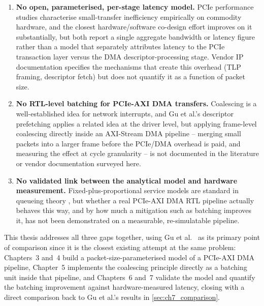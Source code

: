 \begin{enumerate}
\item \textbf{No open, parameterised, per-stage latency model.} PCIe performance studies \cite{neugebauer2018pcie} characterise small-transfer inefficiency empirically on commodity hardware, and the closest hardware/software co-design effort \cite{gu2025cooptimization} improves on it substantially, but both report a single aggregate bandwidth or latency figure rather than a model that separately attributes latency to the PCIe transaction layer versus the DMA descriptor-processing stage. Vendor IP documentation \cite{xilinx2021axidma, xilinx2021pcieintblock} specifies the mechanisms that create this overhead (TLP framing, descriptor fetch) but does not quantify it as a function of packet size.
\item \textbf{No RTL-level batching for PCIe-AXI DMA transfers.} Coalescing is a well-established idea for network interrupts, and Gu et al.'s descriptor prefetching \cite{gu2025cooptimization} applies a related idea at the driver level, but applying frame-level coalescing directly inside an AXI-Stream DMA pipeline -- merging small packets into a larger frame before the PCIe/DMA overhead is paid, and measuring the effect at cycle granularity -- is not documented in the literature or vendor documentation surveyed here.
\item \textbf{No validated link between the analytical model and hardware measurement.} Fixed-plus-proportional service models are standard in queueing theory \cite{kleinrock1975queueing}, but whether a real PCIe-AXI DMA RTL pipeline actually behaves this way, and by how much a mitigation such as batching improves it, has not been demonstrated on a measurable, re-simulatable pipeline.
\end{enumerate}

This thesis addresses all three gaps together, using Gu et al.~\cite{gu2025cooptimization} as its primary point of comparison since it is the closest existing attempt at the same problem: Chapters~3 and~4 build a packet-size-parameterised model of a PCIe-AXI DMA pipeline, Chapter~5 implements the coalescing principle directly as a batching unit inside that pipeline, and Chapters~6 and~7 validate the model and quantify the batching improvement against hardware-measured latency, closing with a direct comparison back to Gu et al.'s results in \autoref{sec:ch7_comparison}.